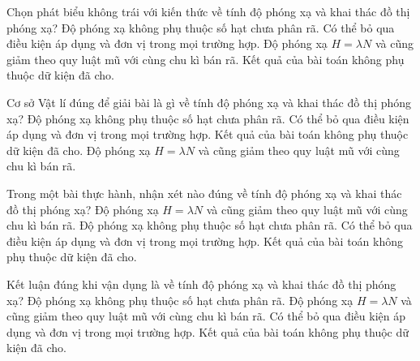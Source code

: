 \begin{ex}
Chọn phát biểu không trái với kiến thức về tính độ phóng xạ và khai thác đồ thị phóng xạ?
\choice
{Độ phóng xạ không phụ thuộc số hạt chưa phân rã.}
{Có thể bỏ qua điều kiện áp dụng và đơn vị trong mọi trường hợp.}
{\True Độ phóng xạ $H=\lambda N$ và cũng giảm theo quy luật mũ với cùng chu kì bán rã.}
{Kết quả của bài toán không phụ thuộc dữ kiện đã cho.}
\end{ex}

\begin{ex}
Cơ sở Vật lí đúng để giải bài là gì về tính độ phóng xạ và khai thác đồ thị phóng xạ?
\choice
{Độ phóng xạ không phụ thuộc số hạt chưa phân rã.}
{Có thể bỏ qua điều kiện áp dụng và đơn vị trong mọi trường hợp.}
{Kết quả của bài toán không phụ thuộc dữ kiện đã cho.}
{\True Độ phóng xạ $H=\lambda N$ và cũng giảm theo quy luật mũ với cùng chu kì bán rã.}
\end{ex}

\begin{ex}
Trong một bài thực hành, nhận xét nào đúng về tính độ phóng xạ và khai thác đồ thị phóng xạ?
\choice
{\True Độ phóng xạ $H=\lambda N$ và cũng giảm theo quy luật mũ với cùng chu kì bán rã.}
{Độ phóng xạ không phụ thuộc số hạt chưa phân rã.}
{Có thể bỏ qua điều kiện áp dụng và đơn vị trong mọi trường hợp.}
{Kết quả của bài toán không phụ thuộc dữ kiện đã cho.}
\end{ex}

\begin{ex}
Kết luận đúng khi vận dụng là về tính độ phóng xạ và khai thác đồ thị phóng xạ?
\choice
{Độ phóng xạ không phụ thuộc số hạt chưa phân rã.}
{\True Độ phóng xạ $H=\lambda N$ và cũng giảm theo quy luật mũ với cùng chu kì bán rã.}
{Có thể bỏ qua điều kiện áp dụng và đơn vị trong mọi trường hợp.}
{Kết quả của bài toán không phụ thuộc dữ kiện đã cho.}
\end{ex}

